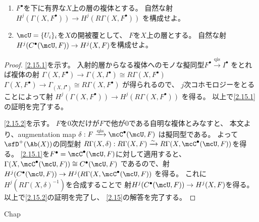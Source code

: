 \documentclass[uplatex,dvipdfmx]{jsarticle}
\begin{document}
\maketitle
\HeaderCommentA
\section{}

\fi



\begin{prob}\label{2.15}
  \begin{enumerate}
    \item \label{2.15.1}
    \(F^{\bullet}\)を下に有界な\(X\)上の層の複体とする。
    自然な射
    \(H^j(\Gamma(X,F^{\bullet})) \to H^j(R\Gamma(X,F^{\bullet}))\)
    を構成せよ。
    \item \label{2.15.2}
    \(\mcU = \{U_i\}_i\)を\(X\)の開被覆として、
    \(F\)を\(X\)上の層とする。
    自然な射\(H^j(C^{\bullet}(\mcU,F)) \to H^j(X,F)\)を構成せよ。
  \end{enumerate}
\end{prob}

\begin{proof}
  \ref{2.15.1}を示す。
  入射的層からなる複体へのモノな擬同型\(F^{\bullet}\xrightarrow{\text{qis}}I^{\bullet}\)
  をとれば複体の射
  \(\Gamma(X,F^{\bullet})\to \Gamma(X,I^{\bullet})\cong R\Gamma(X,F^{\bullet})\)
  \(\Gamma(X,F^{\bullet})\to \Gamma_(X,I^{\bullet})\cong R\Gamma(X,F^{\bullet})\)
  が得られるので、
  \(j\)次コホモロジーをとることによって射
  \(H^j(\Gamma(X,F^{\bullet})) \to H^j(R\Gamma(X,F^{\bullet}))\)
  を得る。
  以上で\ref{2.15.1}の証明を完了する。

  \ref{2.15.2}を示す。
  \(F\)を\(0\)次だけが\(F\)で他が\(0\)である自明な複体とみなすと、
  本文\cite[Proposition 2.8.4]{kashiwara2002sheaves}より、augmentation map
  \(\delta:F\xrightarrow{\text{qis}} \mcC^{\bullet}(\mcU,F)\)
  は擬同型である。
  よって\(\sfD^+(\Ab(X))\)の同型射
  \(R\Gamma(X,\delta):R\Gamma(X,F)\xrightarrow{\sim}
  R\Gamma(X,\mcC^{\bullet}(\mcU,F))\)を得る。
  \ref{2.15.1}を\(F^{\bullet} = \mcC^{\bullet}(\mcU,F)\)に対して適用すると、
  \(\Gamma(X,\mcC^{\bullet}(\mcU,F)) \cong C^{\bullet}(\mcU,F)\)
  であるので、射
  \(H^j(C^{\bullet}(\mcU,F)) \to H^j(R\Gamma(X,\mcC^{\bullet}(\mcU,F))\)
  を得る。
  これに\(H^j(R\Gamma(X,\delta)^{-1})\)を合成することで
  射\(H^j(C^{\bullet}(\mcU,F))\to H^j(X,F)\)を得る。
  以上で\ref{2.15.2}の証明を完了し、
  \autoref{2.15}の解答を完了する。
\end{proof}




\ifcsname Chap\endcsname\else
\printbibliography
\end{document}
